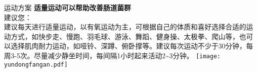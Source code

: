 \begin{LRaside}[.20]{运动方案}
{\bf *适量运动可以帮助改善肠道菌群}\\
建议您：\\
{\indent 建议每天进行适量运动，以有氧运动为主，可根据自己的体质和喜好选择合适的运动方式，如快步走、慢跑、羽毛球、游泳、舞蹈、健身操、太极拳、爬山等，也可以选择肌肉耐力运动，如哑铃、深蹲、俯卧撑等。建议每次运动不少于30分钟，每周3-5次。尽量减少静坐时间，每间隔1小时起来活动2\textasciitilde 3分钟。}
\asidebreak %
\noindent
\texttt{[image: yundongfangan.pdf]}

\end{LRaside}



